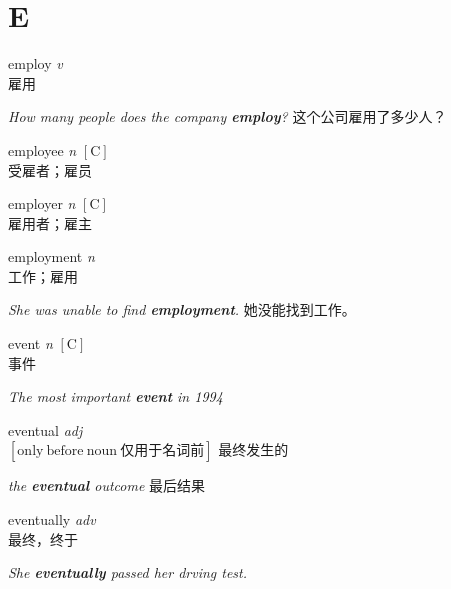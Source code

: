 \section{E}

\item[] {
    \lettrine{employ}{}  
    \textit{v} 
    \\
    雇用

    \textit{How many people does the company \textbf{employ}?}
    这个公司雇用了多少人？
} 

\item[] {
    \lettrine{employee}{}  
    \textit{n} 
    $\mathrm{[C]}$ 
    \\
    受雇者；雇员

} 

\item[] {
    \lettrine{employer}{}  
    \textit{n} 
    $\mathrm{[C]}$ 
    \\
    雇用者；雇主
    
} 

\item[] {
    \lettrine{employment}{}  
    \textit{n} 
    \\
    工作；雇用

    \textit{She was unable to find \textbf{employment}.}
    她没能找到工作。
} 

\item[] {
    \lettrine{event}{}  
    \textit{n} 
    $\mathrm{[C]}$ 
    \\
    事件

    \textit{The most important \textbf{event} in 1994}

} 

\item[] {
    \lettrine{eventual}{}  
    \textit{adj} 
    \\
    $\mathrm{[ only \ before \ noun \ \mbox{仅用于名词前}]}$ 
    最终发生的

    \textit{the \textbf{eventual} outcome} 最后结果

} 

\item[] {
    \lettrine{eventually}{}  
    \textit{adv} 
    \\
    最终，终于

    \textit{She \textbf{eventually} passed her drving test.} 

} 

